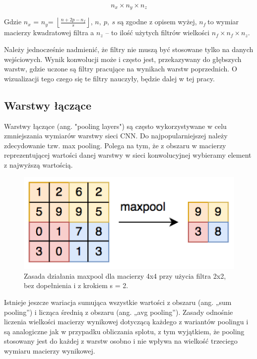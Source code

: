 \[n_{x} \times n_{y} \times n_{z}\]

Gdzie \(n_{x}\) = ­­\(n_{y}\)=
\(\left\lfloor \frac{n + 2p - n_{f}}{s} \right\rfloor\), \(n,\ p,\ s\)
są zgodne z opisem wyżej, \(n_{f}\ \)to wymiar macierzy kwadratowej
filtra a \(n_{z}\) -- to ilość użytych filtrów wielkości
\(n_{f} \times n_{f} \times n_{z}\).

Należy jednocześnie nadmienić, że filtry nie muszą być stosowane tylko na danych wejściowych. Wynik konwolucji może i często jest, przekazywany do głębszych warstw, gdzie uczone są filtry pracujące na wynikach warstw poprzednich. O wizualizacji tego czego się te filtry nauczyły, będzie dalej w tej pracy.

\subsection{Warstwy łączące}

Warstwy łączące (ang. "pooling layers") są często wykorzystywane w celu zmniejszania wymiarów warstwy sieci CNN. Do najpopularniejszej należy zdecydowanie tzw. max pooling. Polega na tym, że z obszaru w macierzy reprezentującej wartości danej warstwy w sieci konwolucyjnej wybieramy element z najwyższą wartością.

\begin{figure}[ht]
\centerline{\includegraphics[scale=1]{resources/maxpool.png}}
\caption{Zasada działania maxpool dla macierzy 4x4 przy użycia filtra 2x2, bez dopełnienia i z krokiem s = 2.}
\label{fig:maxpool}
\end{figure}

Istnieje jeszcze wariacja sumująca wszystkie wartości z obszaru (ang. „sum pooling'') i licząca średnią z obszaru (ang. „avg pooling''). Zasady odnośnie liczenia wielkości macierzy wynikowej dotyczącą każdego z wariantów poolingu i są analogiczne jak w przypadku obliczania splotu, z tym wyjątkiem, że pooling stosowany jest do każdej z warstw osobno i nie wpływa na wielkość trzeciego wymiaru macierzy wynikowej.

